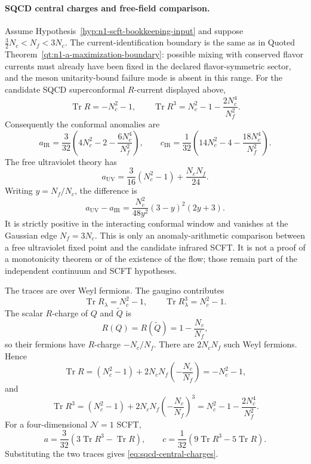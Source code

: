 \paragraph{SQCD central charges and free-field comparison.}
Assume Hypothesis~\ref{hyp:n1-scft-bookkeeping-input} and suppose
\(\frac32N_c<N_f<3N_c\).  The current-identification boundary is the same as
in Quoted Theorem~\ref{qt:n1-a-maximization-boundary}: possible mixing with
conserved flavor currents must already have been fixed in the declared
flavor-symmetric sector, and the meson unitarity-bound failure mode is absent
in this range.  For the candidate SQCD superconformal \(R\)-current displayed
above,
\begin{equation}
  \operatorname{Tr}R=-N_c^2-1,
  \qquad
  \operatorname{Tr}R^3
  =
  N_c^2-1-\frac{2N_c^4}{N_f^2}.
  \label{eq:sqcd-superconformal-r-traces}
\end{equation}
Consequently the conformal anomalies are
\begin{equation}
  a_{\mathrm{IR}}
  =
  \frac3{32}
  \left(
    4N_c^2-2-\frac{6N_c^4}{N_f^2}
  \right),
  \qquad
  c_{\mathrm{IR}}
  =
  \frac1{32}
  \left(
    14N_c^2-4-\frac{18N_c^4}{N_f^2}
  \right).
  \label{eq:sqcd-central-charges}
\end{equation}
The free ultraviolet theory has
\begin{equation}
  a_{\mathrm{UV}}
  =
  \frac3{16}(N_c^2-1)+\frac{N_cN_f}{24}.
  \label{eq:sqcd-free-uv-a}
\end{equation}
Writing \(y=N_f/N_c\), the difference is
\begin{equation}
  a_{\mathrm{UV}}-a_{\mathrm{IR}}
  =
  \frac{N_c^2}{48y^2}
  (3-y)^2(2y+3).
  \label{eq:sqcd-free-field-a-comparison}
\end{equation}
It is strictly positive in the interacting conformal window and vanishes at
the Gaussian edge \(N_f=3N_c\).  This is only an anomaly-arithmetic
comparison between a free ultraviolet fixed point and the candidate
infrared SCFT.  It is not a proof of a monotonicity theorem or of the
existence of the flow; those remain part of the independent continuum and
SCFT hypotheses.

The traces are over Weyl fermions.  The gaugino contributes
\[
  \operatorname{Tr}R_{\lambda}=N_c^2-1,
  \qquad
  \operatorname{Tr}R_{\lambda}^3=N_c^2-1 .
\]
The scalar \(R\)-charge of \(Q\) and \(\widetilde Q\) is
\[
  R(Q)=R(\widetilde Q)=1-\frac{N_c}{N_f},
\]
so their fermions have \(R\)-charge \(-N_c/N_f\).  There are
\(2N_cN_f\) such Weyl fermions.  Hence
\[
  \operatorname{Tr}R
  =
  (N_c^2-1)+2N_cN_f\left(-\frac{N_c}{N_f}\right)
  =
  -N_c^2-1,
\]
and
\[
  \operatorname{Tr}R^3
  =
  (N_c^2-1)
  +2N_cN_f\left(-\frac{N_c}{N_f}\right)^3
  =
  N_c^2-1-\frac{2N_c^4}{N_f^2}.
\]
For a four-dimensional \(\mathcal N=1\) SCFT,
\begin{equation}
  a=\frac3{32}(3\operatorname{Tr}R^3-\operatorname{Tr}R),
  \qquad
  c=\frac1{32}(9\operatorname{Tr}R^3-5\operatorname{Tr}R).
  \label{eq:n1-central-charge-from-r-traces}
\end{equation}
Substituting the two traces gives \eqref{eq:sqcd-central-charges}.

